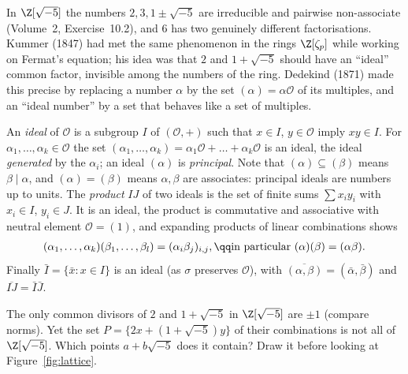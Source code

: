 In $\Z[\sqrt{-5}]$ the numbers $2,3,1\pm\sqrt{-5}$ are irreducible and pairwise non-associate (Volume~2, Exercise~10.2), and $6$ has two genuinely different factorisations. Kummer (1847) had met the same phenomenon in the rings $\Z[\zeta_p]$ while working on Fermat's equation; his idea was that $2$ and $1+\sqrt{-5}$ should have an ``ideal'' common factor, invisible among the numbers of the ring. Dedekind (1871) made this precise by replacing a number $\alpha$ by the set $(\alpha)=\alpha\mathcal O$ of its multiples, and an ``ideal number'' by a set that behaves like a set of multiples.

An \emph{ideal} of $\mathcal O$ is a subgroup $I$ of $(\mathcal O,+)$ such that $x\in I$, $y\in\mathcal O$ imply $xy\in I$. For $\alpha_1,\dots,\alpha_k\in\mathcal O$ the set $(\alpha_1,\dots,\alpha_k)=\alpha_1\mathcal O+\dots+\alpha_k\mathcal O$ is an ideal, the ideal \emph{generated} by the $\alpha_i$; an ideal $(\alpha)$ is \emph{principal}. Note that $(\alpha)\subseteq(\beta)$ means $\beta\mid\alpha$, and $(\alpha)=(\beta)$ means $\alpha,\beta$ are associates: principal ideals are numbers up to units. The \emph{product} $IJ$ of two ideals is the set of finite sums $\sum x_iy_i$ with $x_i\in I$, $y_i\in J$. It is an ideal, the product is commutative and associative with neutral element $\mathcal O=(1)$, and expanding products of linear combinations shows
\[
\begin{gathered}(\alpha_1,\dots,\alpha_k)(\beta_1,\dots,\beta_l)=(\alpha_i\beta_j)_{i,j},\qq\text{in particular }(\alpha)(\beta)=(\alpha\beta).\end{gathered}
\]
Finally $\bar I=\{\bar x:x\in I\}$ is an ideal (as $\sigma$ preserves $\mathcal O$), with $\overline{(\alpha,\beta)}=(\bar\alpha,\bar\beta)$ and $\overline{IJ}=\bar I\bar J$.

\begin{think}
The only common divisors of $2$ and $1+\sqrt{-5}$ in $\Z[\sqrt{-5}]$ are $\pm1$ (compare norms). Yet the set $P=\{2x+(1+\sqrt{-5})y\}$ of their combinations is not all of $\Z[\sqrt{-5}]$. Which points $a+b\sqrt{-5}$ does it contain? Draw it before looking at Figure~\ref{fig:lattice}.
\end{think}

